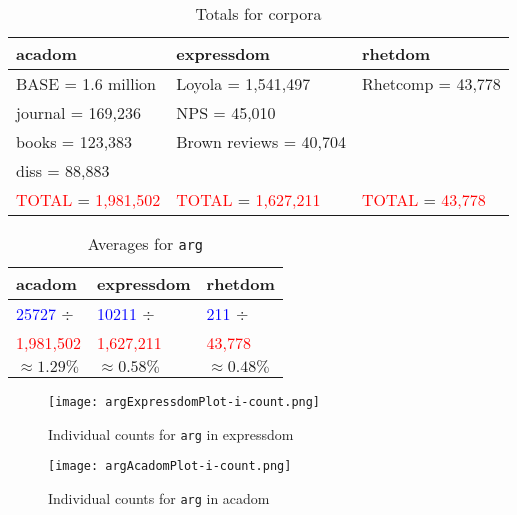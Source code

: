 \documentclass{article}
\begin{document}
\begin{table}[H]
\caption{Totals for corpora}\label{corpcount}
\begin{center}
\begin{tabular}{|l|l|l|}
    \hline
\textbf{acadom} &\textbf{expressdom} & \textbf{rhetdom}\\
\hline \hline
BASE = 1.6 million & Loyola = 1,541,497 & Rhetcomp = 43,778\\
journal = 169,236 & NPS = 45,010 & {} \\
books = 123,383 & Brown reviews = 40,704 & {} \\
diss = 88,883 & {} & {} \\
\hline \hline
\textcolor{red}{TOTAL} = \textcolor{red}{1,981,502} & \textcolor{red}{TOTAL} = \textcolor{red}{1,627,211} & \textcolor{red}{TOTAL} = \textcolor{red}{43,778}\\
   \hline
\end{tabular}
\end{center}
\end{table} 

\begin{table}[!ht]
\caption{Averages for \texttt{arg}}\label{argaverage}
\begin{center}
\begin{tabular}{|l|l|l|}
    \hline
\textbf{acadom} &\textbf{expressdom} & \textbf{rhetdom}\\
\hline
\textcolor{blue}{25727} $\div$ & \textcolor{blue}{10211} $\div$ & \textcolor{blue}{211} $\div$ \\
\textcolor{red}{1,981,502} & \textcolor{red}{1,627,211} & \textcolor{red}{43,778}\\
\hline \hline
$\approx 1.29\%$ & $\approx 0.58\%$ & $\approx 0.48\%$ \\
\hline
\end{tabular}
\end{center}
\end{table} 
 

\begin{figure}[!ht]
\texttt{[image: argExpressdomPlot-i-count.png]}
\caption{Individual counts for \texttt{arg} in expressdom}
\end{figure}       

\begin{figure}[!ht]
\texttt{[image: argAcadomPlot-i-count.png]}
\caption{Individual counts for \texttt{arg} in acadom}
\end{figure}       
\end{document}

